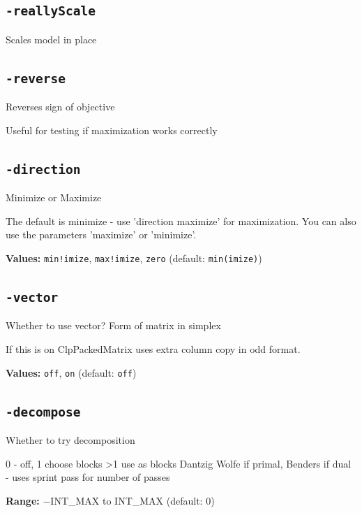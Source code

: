 \documentclass[11pt,a4paper]{article}
\begin{document}
\subsection*{\texttt{-reallyScale}}

Scales model in place

\subsection*{\texttt{-reverse}}

Reverses sign of objective

Useful for testing if maximization works correctly

\subsection*{\texttt{-direction}}

Minimize or Maximize

The default is minimize - use 'direction maximize' for maximization.
 You can also use the parameters 'maximize' or 'minimize'.

\textbf{Values:} \texttt{min!imize}, \texttt{max!imize}, \texttt{zero} (default: \texttt{min(imize)})

\subsection*{\texttt{-vector}}

Whether to use vector? Form of matrix in simplex

If this is on ClpPackedMatrix uses extra column copy in odd format.

\textbf{Values:} \texttt{off}, \texttt{on} (default: \texttt{off})

\subsection*{\texttt{-decompose}}

Whether to try decomposition

0 - off, 1 choose blocks >1 use as blocks Dantzig Wolfe if primal, Benders if dual - uses sprint pass for number of passes

\textbf{Range:} $-$INT\_MAX to INT\_MAX (default: 0)
\end{document}
